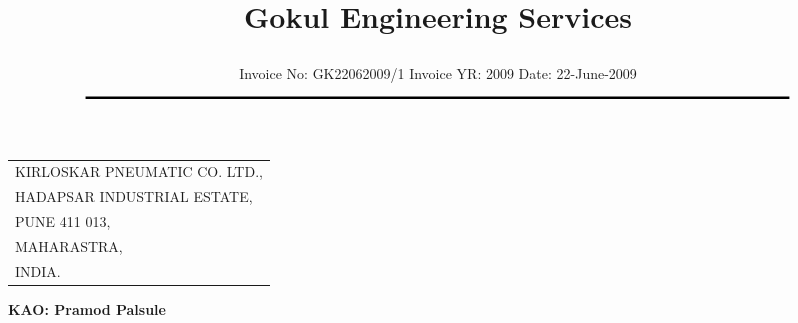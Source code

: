 \documentclass[11pt]{article}
\title{\vspace*{1cm} \centerline{ \Huge { \bf \hspace{0cm} Gokul Engineering Services}\vspace*{-0.5cm}}}
\author{%
 \scriptsize Invoice No: GK22062009/1  \hspace*{4cm}  Invoice YR: 2009 \hspace*{4cm} Date:  22-June-2009\\
$\rule{7.0in}{0.5mm}$}
\date{}
\begin{document}
\maketitle
\thispagestyle{empty}
\vspace*{0cm}	
\begin{flushleft}
{\small{
\begin{tabular}{l}
KIRLOSKAR PNEUMATIC CO. LTD.,   \\
HADAPSAR INDUSTRIAL ESTATE, \\ 
PUNE 411 013, \\
MAHARASTRA,\\
INDIA. \\
\end{tabular}
}}
\end{flushleft}

\vspace*{-2cm}\hfill{\bf KAO: Pramod Palsule}\
\vspace*{3cm}

\vspace*{-1cm}

\end{document}

